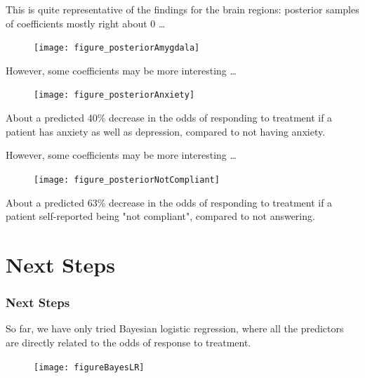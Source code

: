 \documentclass{beamer}
\begin{document}

\begin{frame}
This is quite representative of the findings for the brain regions: posterior samples of coefficients mostly right about 0 \ldots

\begin{figure}
\texttt{[image: figure\_posteriorAmygdala]}
\end{figure}

\end{frame}


\begin{frame}
However, some coefficients may be more interesting \ldots

\begin{figure}
\texttt{[image: figure\_posteriorAnxiety]}
\end{figure}
About a predicted 40\% decrease in the odds of responding to treatment if a patient has anxiety as well as depression, compared to not having anxiety.

\end{frame}


\begin{frame}
However, some coefficients may be more interesting \ldots

\begin{figure}
\texttt{[image: figure\_posteriorNotCompliant]}
\end{figure}
About a predicted 63\% decrease in the odds of responding to treatment if a patient self-reported being "not compliant", compared to not answering.

\end{frame}


\section{Next Steps}
\begin{frame}
\frametitle{Next Steps}
So far, we have only tried Bayesian logistic regression, where all the predictors are directly related to the odds of response to treatment.

\begin{figure}
\texttt{[image: figureBayesLR]}
\end{figure}

\end{frame}
\end{document}
